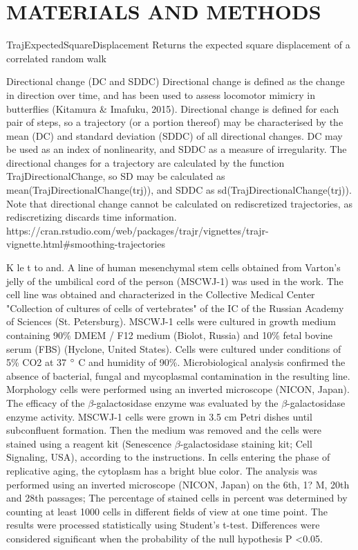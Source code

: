 \documentclass[english,authoryear]{elsarticle}
\begin{document}
\section{MATERIALS AND METHODS}

TrajExpectedSquareDisplacement	Returns the expected square displacement of a correlated random walk

Directional change (DC and SDDC)
Directional change is defined as the change in direction over time, and has been used to assess locomotor mimicry in butterflies (Kitamura & Imafuku, 2015). Directional change is defined for each pair of steps, so a trajectory (or a portion thereof) may be characterised by the mean (DC) and standard deviation (SDDC) of all directional changes. DC may be used as an index of nonlinearity, and SDDC as a measure of irregularity. The directional changes for a trajectory are calculated by the function TrajDirectionalChange, so SD may be calculated as mean(TrajDirectionalChange(trj)), and SDDC as sd(TrajDirectionalChange(trj)). Note that directional change cannot be calculated on rediscretized trajectories, as rediscretizing discards time information.
https://cran.rstudio.com/web/packages/trajr/vignettes/trajr-vignette.html#smoothing-trajectories


K le t to and. A line of human mesenchymal stem cells obtained from Varton's jelly of the umbilical cord of the person (MSCWJ-1) was used in the work. The cell line was obtained and characterized in the Collective Medical Center "Collection of cultures of cells of vertebrates" of the IC of the Russian Academy of Sciences (St. Petersburg). MSCWJ-1 cells were cultured in growth medium containing 90\% DMEM / F12 medium (Biolot, Russia) and 10\% fetal bovine serum (FBS) (Hyclone, United States). Cells were cultured under conditions of 5\% CO2 at 37 $\degree$ C and humidity of 90\%. Microbiological analysis confirmed the absence of bacterial, fungal and mycoplasmal contamination in the resulting line.
 Morphology cells were performed using an inverted microscope (NICON, Japan).
The efficacy of the $\beta$-galactosidase enzyme was evaluated by the $\beta$-galactosidase enzyme activity. MSCWJ-1 cells were grown in 3.5 cm Petri dishes until subconfluent formation. Then the medium was removed and the cells were stained using a reagent kit (Senescence $\beta$-galactosidase staining kit; Cell Signaling, USA), according to the instructions. In cells entering the phase of replicative aging, the cytoplasm has a bright blue color. The analysis was performed using an inverted microscope (NICON, Japan) on the 6th, 1? M, 20th and 28th passages; The percentage of stained cells in percent was determined by counting at least 1000 cells in different fields of view at one time point. The results were processed statistically using Student's t-test. Differences were considered significant when the probability of the null hypothesis P <0.05.
\end{document}
